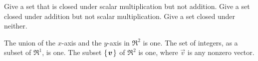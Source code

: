 

\begin{Exercise}[
name={},
title={}, 
difficulty=0,
origin={\cite{JH}}]
\Question Give a set that is closed under scalar multiplication
        but not addition.
\Question Give a set closed under addition but not scalar
        multiplication.
\Question Give a set closed under neither.
\end{Exercise}

\begin{Answer}
\Question The union of the \( x \)-axis and the \( y \)-axis
          in \( \Re^2 \) is one.
\Question The set of integers, as a subset of \( \Re^1 \), is one.
\Question The subset \( \mbox{$\left\{\hspace{0.1em}\bm{v}\hspace{0.1em}\right\}$} \) of \( \Re^2 \) is one,
          where $\vec{v}$ is any nonzero vector.
\end{Answer}
